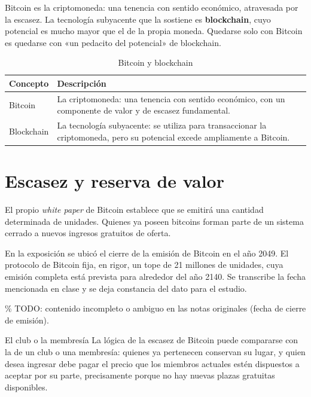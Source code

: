 \documentclass[12pt,oneside]{book}
\begin{document}
\begin{important}
Bitcoin es la criptomoneda: una tenencia con sentido económico, atravesada por la escasez. La tecnología subyacente que la sostiene es \textbf{blockchain}, cuyo potencial es mucho mayor que el de la propia moneda. Quedarse solo con Bitcoin es quedarse con «un pedacito del potencial» de blockchain.
\end{important}

\begin{table}[H]
\centering
\caption{Bitcoin y blockchain}
\begin{tabular}{p{}p{}}
\toprule
\textbf{Concepto} & \textbf{Descripción} \\
\midrule
Bitcoin & La criptomoneda: una tenencia con sentido económico, con un componente de valor y de escasez fundamental. \\
Blockchain & La tecnología subyacente: se utiliza para transaccionar la criptomoneda, pero su potencial excede ampliamente a Bitcoin. \\
\bottomrule
\end{tabular}
\end{table}

\section{Escasez y reserva de valor}

El propio \textit{white paper} de Bitcoin establece que se emitirá una cantidad determinada de unidades. Quienes ya poseen bitcoins forman parte de un sistema cerrado a nuevos ingresos gratuitos de oferta.

\begin{note}
En la exposición se ubicó el cierre de la emisión de Bitcoin en el año 2049. El protocolo de Bitcoin fija, en rigor, un tope de 21 millones de unidades, cuya emisión completa está prevista para alrededor del año 2140. Se transcribe la fecha mencionada en clase y se deja constancia del dato para el estudio.

\% TODO: contenido incompleto o ambiguo en las notas originales (fecha de cierre de emisión).
\end{note}

\begin{example}{El club o la membresía}
La lógica de la escasez de Bitcoin puede compararse con la de un club o una membresía: quienes ya pertenecen conservan su lugar, y quien desea ingresar debe pagar el precio que los miembros actuales estén dispuestos a aceptar por su parte, precisamente porque no hay nuevas plazas gratuitas disponibles.
\end{example}
\end{document}
